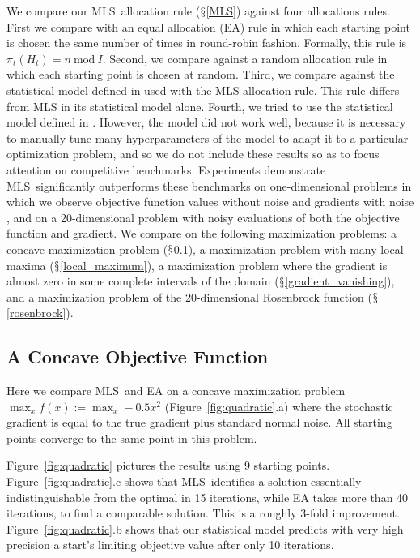 \documentclass[12pt,english]{article}
\newcommand{\stedit}[1]{{\color{blue} #1}}
\newcommand{\abbrv}{MLS}
\begin{document}
We compare our \abbrv\ allocation rule ($\mathsection$\ref{MLS}) against four allocations rules. First we compare with an equal allocation (EA) rule in which each starting point is chosen the same number of times in round-robin fashion.  Formally, this rule is  $\pi_t(H_t) =  n\ \mbox{mod}\ I$. \stedit{Second, we compare against a random allocation rule in which each starting point is chosen at random.} Third, we compare against the statistical model defined in \cite{Swersky:2014} used with the MLS allocation rule.  This rule differs from MLS in its statistical model alone.
Fourth, we tried to use the statistical model defined in \cite{Hutter:2015}. However, the model did not work well, because it is necessary to manually tune many hyperparameters of the model to adapt it to a particular optimization problem, and so we do not include these results so as to focus attention on competitive benchmarks. Experiments demonstrate \abbrv\ significantly outperforms these benchmarks on one-dimensional problems in which we observe objective function values without noise and gradients with noise\stedit{, and on a 20-dimensional problem with noisy evaluations of both the objective function and gradient.} We compare on the following maximization problems: a concave maximization problem ($\mathsection$\ref{concave}), a maximization problem with many local maxima ($\mathsection$\ref{local_maximum}), a maximization problem where the gradient is almost zero in some complete intervals of the domain ($\mathsection$\ref{gradient_vanishing}), \stedit{and a maximization problem of the 20-dimensional Rosenbrock function ($\mathsection$\ref{rosenbrock})}. 

\subsection{A Concave Objective Function}
\label{concave}

Here we compare \abbrv\ and EA on a concave maximization problem $\max_{x} f(x):= \max_{x} -0.5x^2$ 
(Figure~\ref{fig:quadratic}.a) where the stochastic gradient is equal to the true gradient plus standard normal noise.  All starting points converge to the same point in this problem. 

Figure~\ref{fig:quadratic} pictures the results using $9$ starting points. Figure~\ref{fig:quadratic}.c shows that \abbrv\ identifies a solution essentially indistinguishable from the optimal in 15 iterations, while EA takes more than 40 iterations, to find a comparable solution. This is a roughly 3-fold improvement. Figure~\ref{fig:quadratic}.b shows that our statistical model predicts with very high precision a start's limiting objective value after only 10 iterations. 
\end{document}
